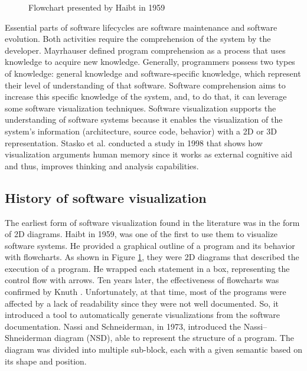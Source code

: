 \begin{figure}
  \caption{Flowchart presented by Haibt in 1959}
  \label{fig:Haibt1959_Flowchart}

\end{figure}

Essential parts of software lifecycles are software maintenance and software evolution. 
Both activities require the comprehension of the system by the developer. 
Mayrhauser \cite{VonMayrhauser1995} defined program comprehension as a process that uses knowledge to acquire new knowledge. 
Generally, programmers possess two types of knowledge: general knowledge and software-specific knowledge, which represent their level of understanding of that software. 
Software comprehension aims to increase this specific knowledge of the system, and, to do that, it can leverage some software visualization techniques. 
Software visualization supports the understanding of software systems because it enables the visualization of the system's information (architecture, source code, behavior) with a 2D or 3D representation. 
Stasko et al.\cite{Stasko2008} conducted a study in 1998 that shows how visualization arguments human memory since it works as external cognitive aid and thus, improves thinking and analysis capabilities. \\

\subsection*{History of software visualization}



The earliest form of software visualization found in the literature was in the form of 2D diagrams. 
Haibt \cite{Haibt1959} in 1959, was one of the first to use them to visualize software systems. 
He provided a graphical outline of a program and its behavior with flowcharts. As shown in Figure \ref{fig:Haibt1959_Flowchart}, they 
were 2D diagrams that described the execution of a program. He wrapped each statement in a box, representing the control flow with arrows.
Ten years later, the effectiveness of flowcharts was confirmed by Knuth \cite{Knuth1963}. 
Unfortunately, at that time, most of the programs were affected by a lack of readability since they were not well documented. 
So, it introduced a tool to automatically generate visualizations from the software documentation. 
Nassi and Schneiderman\cite{Nassi1973}, in 1973, introduced the Nassi–Shneiderman diagram (NSD), able to represent the structure of a program. 
The diagram was divided into multiple sub-block, each with a given semantic based on its shape and position. 



